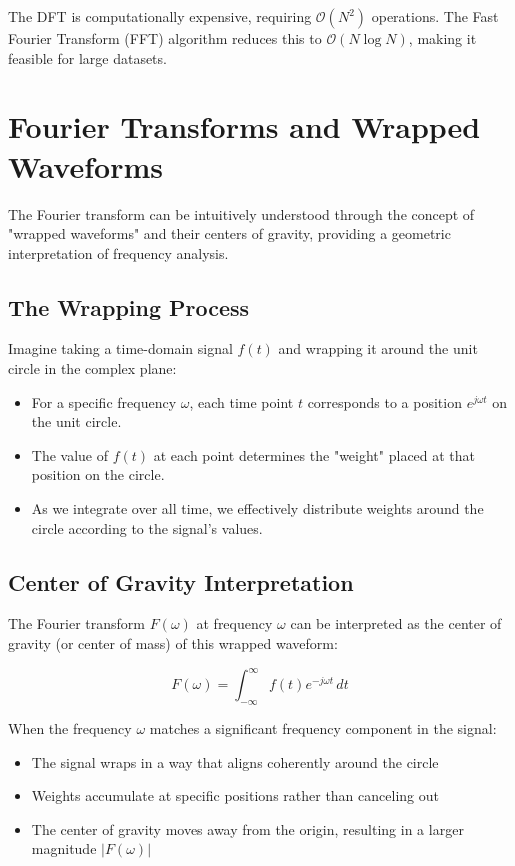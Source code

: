 \documentclass{article}
\begin{document}
The DFT is computationally expensive, requiring $\mathcal{O}(N^2)$ operations. The Fast Fourier Transform (FFT) algorithm reduces this to $\mathcal{O}(N \log N)$, making it feasible for large datasets.




\section{Fourier Transforms and Wrapped Waveforms}

The Fourier transform can be intuitively understood through the concept of "wrapped waveforms" and their centers of gravity, providing a geometric interpretation of frequency analysis.

\subsection{The Wrapping Process}

Imagine taking a time-domain signal $f(t)$ and wrapping it around the unit circle in the complex plane:

\begin{itemize}
    \item For a specific frequency $\omega$, each time point $t$ corresponds to a position $e^{j\omega t}$ on the unit circle.
    \item The value of $f(t)$ at each point determines the "weight" placed at that position on the circle.
    \item As we integrate over all time, we effectively distribute weights around the circle according to the signal's values.
\end{itemize}

\subsection{Center of Gravity Interpretation}

The Fourier transform $F(\omega)$ at frequency $\omega$ can be interpreted as the center of gravity (or center of mass) of this wrapped waveform:

\[
    F(\omega) = \int_{-\infty}^{\infty} f(t) e^{-j\omega t} \, dt
\]

When the frequency $\omega$ matches a significant frequency component in the signal:
\begin{itemize}
    \item The signal wraps in a way that aligns coherently around the circle
    \item Weights accumulate at specific positions rather than canceling out
    \item The center of gravity moves away from the origin, resulting in a larger magnitude $|F(\omega)|$
\end{itemize}
\end{document}
